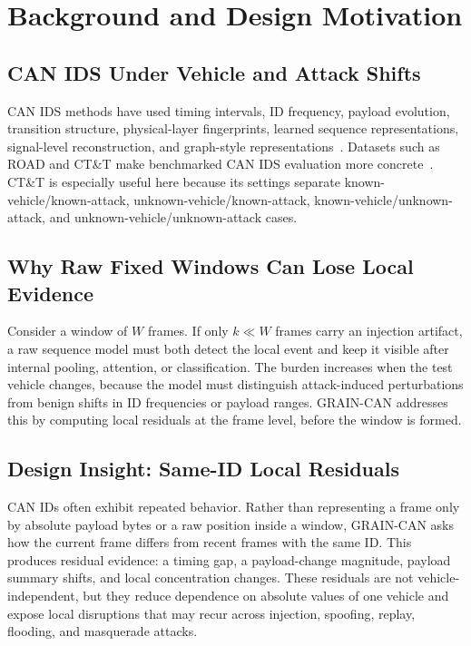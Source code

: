 \documentclass[runningheads]{llncs}
\newcommand{\method}{GRAIN-CAN}
\begin{document}
\section{Background and Design Motivation}
\subsection{CAN IDS Under Vehicle and Attack Shifts}
CAN IDS methods have used timing intervals, ID frequency, payload evolution, transition structure, physical-layer fingerprints, learned sequence representations, signal-level reconstruction, and graph-style representations~\cite{song2016,taylor2015,cho2016,cho2017,shahriar2022,wang2023}. Datasets such as ROAD and CT\&T make benchmarked CAN IDS evaluation more concrete~\cite{verma2020,blevins2021,lampe2024}. CT\&T is especially useful here because its settings separate known-vehicle/known-attack, unknown-vehicle/known-attack, known-vehicle/unknown-attack, and unknown-vehicle/unknown-attack cases.

\subsection{Why Raw Fixed Windows Can Lose Local Evidence}
Consider a window of $W$ frames. If only $k \ll W$ frames carry an injection artifact, a raw sequence model must both detect the local event and keep it visible after internal pooling, attention, or classification. The burden increases when the test vehicle changes, because the model must distinguish attack-induced perturbations from benign shifts in ID frequencies or payload ranges. \method{} addresses this by computing local residuals at the frame level, before the window is formed.

\subsection{Design Insight: Same-ID Local Residuals}
CAN IDs often exhibit repeated behavior. Rather than representing a frame only by absolute payload bytes or a raw position inside a window, \method{} asks how the current frame differs from recent frames with the same ID. This produces residual evidence: a timing gap, a payload-change magnitude, payload summary shifts, and local concentration changes. These residuals are not vehicle-independent, but they reduce dependence on absolute values of one vehicle and expose local disruptions that may recur across injection, spoofing, replay, flooding, and masquerade attacks.
\end{document}
